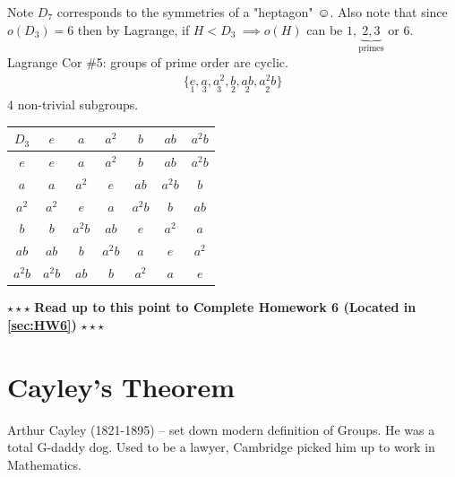\begin{enumerate}
    Note $D_7$ corresponds to the symmetries of a "heptagon" $\smiley{}$. Also note that since $o(D_3)=6$ then by Lagrange, if $H < D_3 \ \implies o(H)$ can be $1,\underbrace{2,3}_{\text{primes}}$ or $6$. \steezybreak\\
    Lagrange Cor \#5: groups of prime order are cyclic. \\
    \begin{align}
        \{\underset{1}{e},\underset{3}{a},\underset{3}{a^2},\underset{2}{b},\underset{2}{ab},\underset{2}{a^2 b}\} \nonumber
    \end{align}
    $4$ non-trivial subgroups. \\
    \begin{tabular}{c|cccccc} 
            $D_3$ & $e$ & $a$ & $a^2$& $b$ & $ab$ & $a^2 b$   \\ \hline 
            $e$ & $e$ & $a$ & $a^2$& $b$ & $ab$ & $a^2 b$   \\  
            $a$ & $a$ & $a^2$ & $e$& $ab$ & $a^2 b$ & $b$   \\ 
            $a^2$ & $a^2$ & $e$ & $a$& $a^2 b$ & $b$ & $ab$   \\  
            $b$ & $b$ & $a^2 b$ & $ab$& $e$ & $a^2$ & $a$   \\  
            $ab$ & $ab$ & $b$ & $a^2b$& $a$ & $e$ & $a^2$   \\  
            $a^2 b$ & $a^2 b$ & $ab$ & $b$& $a^2$ & $a$ & $e$   \\  
    \end{tabular}
\end{enumerate}
\steezybreak
\begin{tcolorbox}
    \begin{center}
        $\star\star\star$ \textbf{Read up to this point to Complete Homework 6 (Located in \ref{sec:HW6})} $\star\star\star$
    \end{center}
    \end{tcolorbox}
\steezybreak
\section{Cayley's Theorem}
Arthur Cayley (1821-1895) -- set down modern definition of Groups. He was a total G-daddy dog. Used to be a lawyer, Cambridge picked him up to work in Mathematics.

